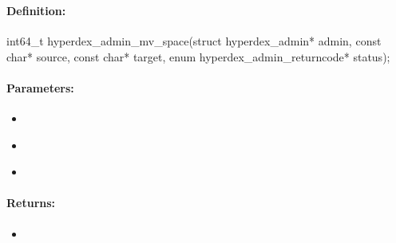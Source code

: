 \pagebreak
\subsubsection{}
\label{api:c:mv_space}


\paragraph{Definition:}
\begin{ccode}
int64_t hyperdex_admin_mv_space(struct hyperdex_admin* admin,
        const char* source,
        const char* target,
        enum hyperdex_admin_returncode* status);
\end{ccode}

\paragraph{Parameters:}
\begin{itemize}[noitemsep]
\item {}\\

\item {}\\

\item {}\\

\end{itemize}

\paragraph{Returns:}
\begin{itemize}[noitemsep]
\item {}\\

\end{itemize}

\pagebreak
\subsubsection{}
\label{api:c:list_spaces}


